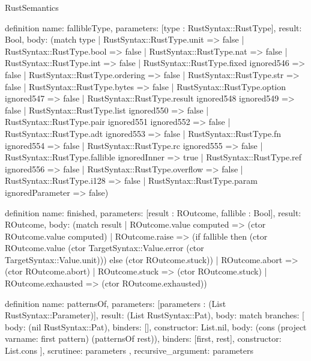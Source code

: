 \begin{lexlean}{RustSemantics}
\begin{semanticmodule}
definition{
  name: fallibleType,
  parameters: [type : RustSyntax::RustType],
  result: Bool,
  body: (match type
    | RustSyntax::RustType.unit => false
    | RustSyntax::RustType.bool => false
    | RustSyntax::RustType.nat => false
    | RustSyntax::RustType.int => false
    | RustSyntax::RustType.fixed ignored546 => false
    | RustSyntax::RustType.ordering => false
    | RustSyntax::RustType.str => false
    | RustSyntax::RustType.bytes => false
    | RustSyntax::RustType.option ignored547 => false
    | RustSyntax::RustType.result ignored548 ignored549 => false
    | RustSyntax::RustType.list ignored550 => false
    | RustSyntax::RustType.pair ignored551 ignored552 => false
    | RustSyntax::RustType.adt ignored553 => false
    | RustSyntax::RustType.fn ignored554 => false
    | RustSyntax::RustType.rc ignored555 => false
    | RustSyntax::RustType.fallible ignoredInner => true
    | RustSyntax::RustType.ref ignored556 => false
    | RustSyntax::RustType.overflow => false
    | RustSyntax::RustType.i128 => false
    | RustSyntax::RustType.param ignoredParameter => false)
}

definition{
  name: finished,
  parameters: [result : ROutcome, fallible : Bool],
  result: ROutcome,
  body: (match result
    | ROutcome.value computed => (ctor ROutcome.value computed)
    | ROutcome.raise => (if fallible then (ctor ROutcome.value (ctor TargetSyntax::Value.error (ctor TargetSyntax::Value.unit))) else (ctor ROutcome.stuck))
    | ROutcome.abort => (ctor ROutcome.abort)
    | ROutcome.stuck => (ctor ROutcome.stuck)
    | ROutcome.exhausted => (ctor ROutcome.exhausted))
}

definition{
  name: patternsOf,
  parameters: [parameters : (List RustSyntax::Parameter)],
  result: (List RustSyntax::Pat),
  body: match{
    branches: [
      {body: (nil RustSyntax::Pat), binders: [], constructor: List.nil},
      {
        body: (cons (project var{name: first} pattern) (patternsOf rest)),
        binders: [first, rest],
        constructor: List.cons
      }
    ],
    scrutinee: parameters
  },
  recursive_argument: parameters
}


\end{semanticmodule}
\end{lexlean}
